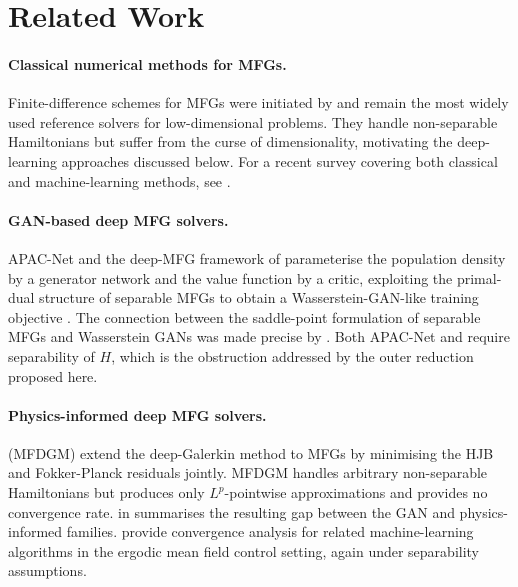 \section{Related Work}
\label{sec:related}

\paragraph{Classical numerical methods for MFGs.}
Finite-difference schemes for MFGs were initiated by
\citet{achdou2010mean} and remain the most widely used reference solvers
for low-dimensional problems.
They handle non-separable Hamiltonians but suffer from the curse of
dimensionality, motivating the deep-learning approaches discussed below.
For a recent survey covering both classical and machine-learning methods,
see \citet{hu2024recent}.

\paragraph{GAN-based deep MFG solvers.}
APAC-Net \citep{lin2021apac} and the deep-MFG framework of
\citet{ruthotto2020machine} parameterise the population density by a
generator network and the value function by a critic, exploiting the
primal-dual structure of separable MFGs to obtain a Wasserstein-GAN-like
training objective \citep{arjovsky2017wasserstein,goodfellow2014generative}.
The connection between the saddle-point formulation of separable MFGs
and Wasserstein GANs was made precise by \citet{cao2021connecting}.
Both APAC-Net and \citet{ruthotto2020machine} require separability of $H$,
which is the obstruction addressed by the outer reduction proposed here.

\paragraph{Physics-informed deep MFG solvers.}
\citet{assouline2023deep} (MFDGM) extend the deep-Galerkin method
\citep{sirignano2018dgm,raissi2019physics} to MFGs by minimising the
HJB and Fokker-Planck residuals jointly.
MFDGM handles arbitrary non-separable Hamiltonians but produces only
$L^p$-pointwise approximations and provides no convergence rate.
 in  summarises the resulting
gap between the GAN and physics-informed families.
\citet{carmona2021deep} provide convergence analysis for related
machine-learning algorithms in the ergodic mean field control setting,
again under separability assumptions.


